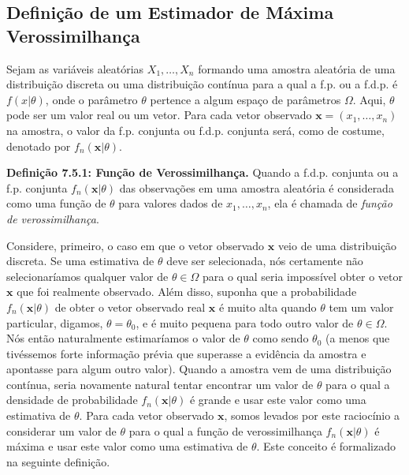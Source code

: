 \subsection*{Definição de um Estimador de Máxima Verossimilhança}
Sejam as variáveis aleatórias $X_1, \dots, X_n$ formando uma amostra aleatória de uma distribuição discreta ou uma distribuição contínua para a qual a f.p. ou a f.d.p. é $f(x|\theta)$, onde o parâmetro $\theta$ pertence a algum espaço de parâmetros $\Omega$. Aqui, $\theta$ pode ser um valor real ou um vetor. Para cada vetor observado $\textbf{x} = (x_1, \dots, x_n)$ na amostra, o valor da f.p. conjunta ou f.d.p. conjunta será, como de costume, denotado por $f_n(\textbf{x}|\theta)$.

\vspace{\baselineskip}

\textbf{Definição 7.5.1: Função de Verossimilhança.} Quando a f.d.p. conjunta ou a f.p. conjunta $f_n(\textbf{x}|\theta)$ das observações em uma amostra aleatória é considerada como uma função de $\theta$ para valores dados de $x_1, \dots, x_n$, ela é chamada de \textit{função de verossimilhança}.

\vspace{\baselineskip}

Considere, primeiro, o caso em que o vetor observado $\textbf{x}$ veio de uma distribuição discreta. Se uma estimativa de $\theta$ deve ser selecionada, nós certamente não selecionaríamos qualquer valor de $\theta \in \Omega$ para o qual seria impossível obter o vetor $\textbf{x}$ que foi realmente observado. Além disso, suponha que a probabilidade $f_n(\textbf{x}|\theta)$ de obter o vetor observado real $\textbf{x}$ é muito alta quando $\theta$ tem um valor particular, digamos, $\theta = \theta_0$, e é muito pequena para todo outro valor de $\theta \in \Omega$. Nós então naturalmente estimaríamos o valor de $\theta$ como sendo $\theta_0$ (a menos que tivéssemos forte informação prévia que superasse a evidência da amostra e apontasse para algum outro valor). Quando a amostra vem de uma distribuição contínua, seria novamente natural tentar encontrar um valor de $\theta$ para o qual a densidade de probabilidade $f_n(\textbf{x}|\theta)$ é grande e usar este valor como uma estimativa de $\theta$. Para cada vetor observado $\textbf{x}$, somos levados por este raciocínio a considerar um valor de $\theta$ para o qual a função de verossimilhança $f_n(\textbf{x}|\theta)$ é máxima e usar este valor como uma estimativa de $\theta$. Este conceito é formalizado na seguinte definição.

